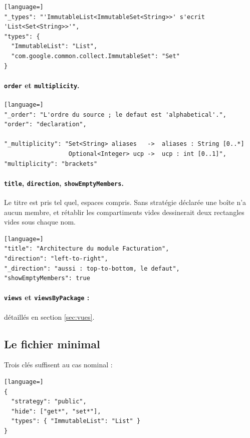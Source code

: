 \documentclass[12pt, a4paper]{article}
\begin{document}
\begin{lstlisting}[language=]
"_types": "'ImmutableList<ImmutableSet<String>>' s'ecrit 'List<Set<String>>'",
"types": {
  "ImmutableList": "List",
  "com.google.common.collect.ImmutableSet": "Set"
}
\end{lstlisting}

\paragraph{\texttt{order} et \texttt{multiplicity}.}
\begin{lstlisting}[language=]
"_order": "L'ordre du source ; le defaut est 'alphabetical'.",
"order": "declaration",

"_multiplicity": "Set<String> aliases   ->  aliases : String [0..*]
                  Optional<Integer> ucp ->  ucp : int [0..1]",
"multiplicity": "brackets"
\end{lstlisting}

\paragraph{\texttt{title}, \texttt{direction}, \texttt{showEmptyMembers}.} Le titre est pris tel quel, espaces compris. Sans stratégie déclarée une boîte n'a aucun membre, et rétablir les compartiments vides dessinerait deux rectangles vides sous chaque nom.
\begin{lstlisting}[language=]
"title": "Architecture du module Facturation",
"direction": "left-to-right",
"_direction": "aussi : top-to-bottom, le defaut",
"showEmptyMembers": true
\end{lstlisting}

\paragraph{\texttt{views} et \texttt{viewsByPackage} :} détaillés en section \ref{sec:vues}.

\subsection{Le fichier minimal}
Trois clés suffisent au cas nominal :
\begin{lstlisting}[language=]
{
  "strategy": "public",
  "hide": ["get*", "set*"],
  "types": { "ImmutableList": "List" }
}
\end{lstlisting}
\end{document}
